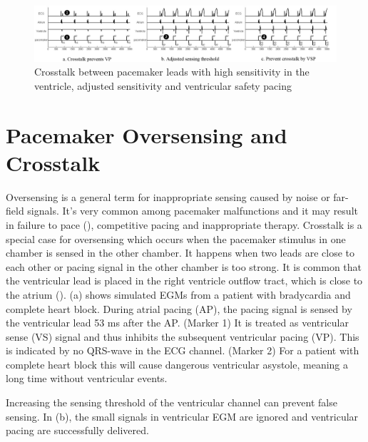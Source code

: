 \begin{figure}[b]
\center
\vspace{-10pt}
		\includegraphics[width=\textwidth]{figs/crosstalk_all.pdf}
\vspace{-20pt}
\caption{Crosstalk between pacemaker leads with high sensitivity in the ventricle, adjusted sensitivity and ventricular safety pacing}
\label{fig:crosstalk}
\vspace{-15pt}
\end{figure}
\section{Pacemaker Oversensing and Crosstalk}
Oversensing is a general term for inappropriate sensing caused by noise or far-field signals. It's very common among pacemaker malfunctions and it may result in failure to pace (\cite{med2, leads}), competitive pacing and inappropriate therapy. Crosstalk is a special case for oversensing which occurs when the pacemaker stimulus in one chamber is sensed in the other chamber. It happens when two leads are close to each other or pacing signal in the other chamber is too strong. It is common that the ventricular lead is placed in the right ventricle outflow tract, which is close to the atrium (\cite{icd}). (a) shows simulated EGMs from a patient with bradycardia and complete heart block. During atrial pacing (AP), the pacing signal is sensed by the ventricular lead 53 ms after the AP. (Marker 1) It is treated as ventricular sense (VS) signal and thus inhibits the subsequent ventricular pacing (VP). This is indicated by no QRS-wave in the ECG channel. (Marker 2) For a patient with complete heart block this will cause dangerous ventricular asystole, meaning a long time without ventricular events.  

Increasing the sensing threshold of the ventricular channel can prevent false sensing. In (b), the small signals in ventricular EGM are ignored and ventricular pacing are successfully delivered. 


